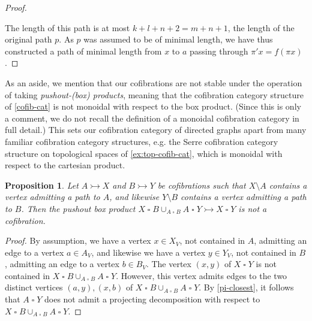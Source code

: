 \documentclass[11pt]{article}
\newtheorem{proposition}[theo]{Proposition}
\theoremstyle{definition}
\numberwithin{equation}{section}
\newcommand{\gtimes}{\mathbin{\square}}
\newcommand{\cto}{\rightarrowtail}
\begin{document}
\begin{proof}
\begin{figure}[H]
\end{figure}


The length of this path is at most $k + l + n + 2 = m + n + 1$, the length of the original path $p$. As $p$ was assumed to be of minimal length, we have thus constructed a path of minimal length from $x$ to $a$ passing through $\pi' x = f(\pi x)$.
\end{proof}

As an aside, we mention that our cofibrations are not stable under the operation of taking \emph{pushout-(box) products}, meaning that the cofibration category structure of \cref{cofib-cat} is not monoidal with respect to the box product.
(Since this is only a comment, we do not recall the definition of a monoidal cofibration category in full detail.)
This sets our cofibration category of directed graphs apart from many familiar cofibration category structures, e.g. the Serre cofibration category structure on topological spaces of \cref{ex:top-cofib-cat}, which is monoidal with respect to the cartesian product.

\begin{proposition}
Let $A \cto X$ and $B \cto Y$ be cofibrations such that $X \setminus A$ contains a vertex admitting a path to $A$, and likewise $Y \setminus B$ contains a vertex admitting a path to $B$.
Then the pushout box product $X \gtimes B \cup_{A \gtimes B} A \gtimes Y \cto X \gtimes Y$ is not a cofibration.
\end{proposition}

\begin{proof}
By assumption, we have a vertex $x \in X_V$, not contained in $A$, admitting an edge to a vertex $a \in A_V$, and likewise we have a vertex $y \in Y_V$, not contained in $B$, admitting an edge to a vertex $b \in B_V$. The vertex $(x,y)$ of $X \gtimes Y$ is not contained in $X \gtimes B \cup_{A \gtimes B} A \gtimes Y$. However, this vertex admits edges to the two distinct vertices $(a,y), (x,b)$ of $X \gtimes B \cup_{A \gtimes B} A \gtimes Y$. By \cref{pi-closest}, it follows that $A \gtimes Y$ does not admit a projecting decomposition with respect to $X \gtimes B \cup_{A \gtimes B} A \gtimes Y$.
\end{proof}
\end{document}
